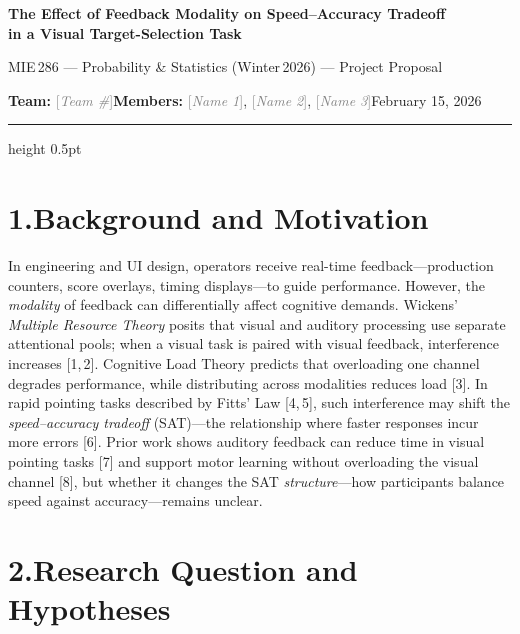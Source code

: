 \documentclass[12pt,letterpaper]{article}
\newcommand{\placeholder}[1]{\textcolor{gray}{[\textit{#1}]}}
\begin{document}
\begin{center}
{\large\bfseries The Effect of Feedback Modality on Speed--Accuracy Tradeoff\\[0.05em]in a Visual Target-Selection Task\par}
\vspace{0.05em}
{\small MIE\,286 --- Probability \& Statistics (Winter\,2026) --- Project Proposal\par}
\vspace{0.05em}
{\small\textbf{Team:} \placeholder{Team \#}\hspace{0.6em}\textbf{Members:} \placeholder{Name 1}, \placeholder{Name 2}, \placeholder{Name 3}\hspace{0.6em}February 15, 2026\par}
\end{center}
\vspace{-0.8em}
{\color{accent}\hrule height 0.5pt}
\vspace{0.15em}

\section*{1.\enspace Background and Motivation}

In engineering and UI design, operators receive real-time feedback---production counters, score overlays, timing displays---to guide performance. However, the \emph{modality} of feedback can differentially affect cognitive demands. Wickens' \emph{Multiple Resource Theory} posits that visual and auditory processing use separate attentional pools; when a visual task is paired with visual feedback, interference increases [1,\,2]. Cognitive Load Theory predicts that overloading one channel degrades performance, while distributing across modalities reduces load [3]. In rapid pointing tasks described by Fitts' Law [4,\,5], such interference may shift the \emph{speed--accuracy tradeoff} (SAT)---the relationship where faster responses incur more errors [6]. Prior work shows auditory feedback can reduce time in visual pointing tasks [7] and support motor learning without overloading the visual channel [8], but whether it changes the SAT \emph{structure}---how participants balance speed against accuracy---remains unclear.

\section*{2.\enspace Research Question and Hypotheses}
\end{document}
